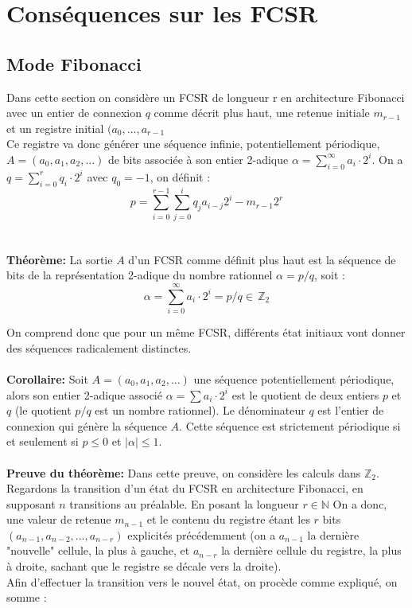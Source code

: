 \documentclass[11pt]{report}
\begin{document}
	\section{Conséquences sur les FCSR}
	\subsection{Mode Fibonacci}
	Dans cette section on considère un FCSR de longueur r en architecture Fibonacci avec un entier de connexion $q$ comme décrit plus haut, une retenue initiale $m_{r-1}$ et un registre initial $(a_0,...,a_{r-1}$ 
	\\
	Ce registre va donc générer une séquence infinie, potentiellement périodique, $A = (a_0,a_1,a_2,...)$ de bits associée à son entier 2-adique $\alpha = \sum_{i=0}^\infty a_i \cdot 2^i$.
	On a $q = \sum_{i=0}^r q_i \cdot 2^i$ avec $q_0 = -1$, on définit : 
	\[
	p= \sum_{i=0}^{r-1} \sum_{j=0}^i q_ja_{i-j}2^i - m_{r-1}2^r
	\]
	\\
	\\
	\textbf{Théorème:}
	La sortie $A$ d'un FCSR comme définit plus haut est la séquence de bits de la représentation 2-adique du nombre rationnel $\alpha = p/q$, soit :
	\[
	\alpha = \sum_{i=0}^\infty a_i \cdot 2^i = p/q \in \, \mathbb{Z}_2
	\]	
	
	On comprend donc que pour un même FCSR, différents état initiaux vont donner des séquences radicalement distinctes. 
	\\
	\\
	\textbf{Corollaire:}
	Soit $A=(a_0,a_1,a_2,...)$ une séquence potentiellement périodique, alors son entier 2-adique associé $\alpha = \sum a_i \cdot 2^i$ est le quotient de deux entiers $p$ et $q$ (le quotient $p/q$ est un nombre rationnel). Le dénominateur $q$ est l'entier de connexion qui génère la séquence $A$. Cette séquence est strictement périodique si et seulement si $p \leq 0$ et $|\alpha| \leq 1$.
	\\
	\\
	\textbf{Preuve du théorème:}
	Dans cette preuve, on considère les calculs dans $\mathbb{Z}_2$. Regardons la transition d'un état du FCSR en architecture Fibonacci, en supposant $n$ transitions au préalable. En posant la longueur $r \in \mathbb{N}$ On a donc, une valeur de retenue $m_{n-1}$ et le contenu du registre étant les $r$ bits $(a_{n-1},a_{n-2},...,a_{n-r})$ explicités précédemment (on a $a_{n-1}$ la dernière "nouvelle" cellule, la plus à gauche, et $a_{n-r}$ la dernière cellule du registre, la plus à droite, sachant que le registre se décale vers la droite). 
	\\
	Afin d'effectuer la transition vers le nouvel état, on procède comme expliqué, on somme : 
	
\end{document}
